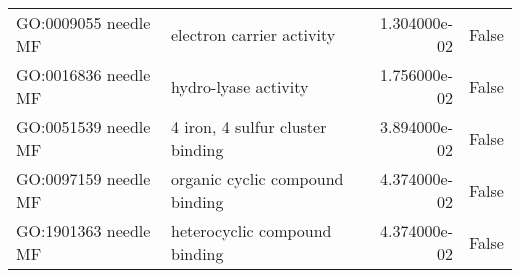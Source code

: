 \begin{tabular}{llrl}
GO:0009055 needle MF       &                    electron carrier activity &   1.304000e-02 &  False \\
GO:0016836 needle MF       &                         hydro-lyase activity &   1.756000e-02 &  False \\
GO:0051539 needle MF       &             4 iron, 4 sulfur cluster binding &   3.894000e-02 &  False \\
GO:0097159 needle MF       &              organic cyclic compound binding &   4.374000e-02 &  False \\
GO:1901363 needle MF       &                heterocyclic compound binding &   4.374000e-02 &  False \\
\bottomrule
\end{tabular}
